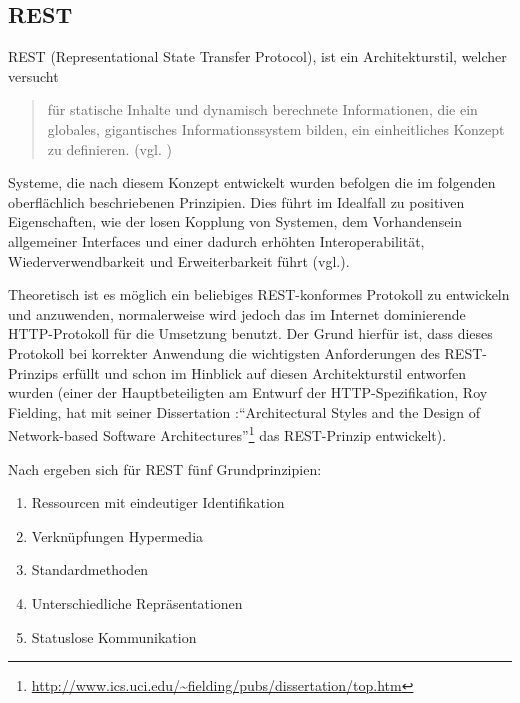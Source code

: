 \subsection{REST}\label{section:rest}
REST (Representational State Transfer Protocol), ist ein Architekturstil, welcher versucht 
\begin{quotation}
für statische Inhalte und dynamisch berechnete Informationen, die ein globales, gigantisches Informationssystem bilden, ein einheitliches Konzept zu definieren. (vgl. \cite{tilkovrestchapter2})
\end{quotation}
Systeme, die nach diesem Konzept entwickelt wurden befolgen die im folgenden oberflächlich beschriebenen Prinzipien. Dies führt im Idealfall zu positiven Eigenschaften, wie der losen Kopplung von Systemen, dem Vorhandensein allgemeiner Interfaces und einer dadurch erhöhten Interoperabilität, Wiederverwendbarkeit und Erweiterbarkeit führt (vgl.\cite{tilkovrestchapter2}).

Theoretisch ist es möglich ein beliebiges REST-konformes Protokoll zu entwickeln und anzuwenden, normalerweise wird jedoch das im Internet dominierende HTTP-Protokoll für die Umsetzung benutzt. Der Grund hierfür ist, dass dieses Protokoll bei korrekter Anwendung die wichtigsten Anforderungen des REST-Prinzips erfüllt und schon im Hinblick auf diesen Architekturstil entworfen wurden (einer der Hauptbeteiligten am Entwurf der HTTP-Spezifikation, Roy Fielding, hat mit seiner Dissertation :"`Architectural Styles and the Design of Network-based Software Architectures"'\footnote{\url{http://www.ics.uci.edu/~fielding/pubs/dissertation/top.htm}} das REST-Prinzip entwickelt). 

Nach \cite{tilkovrestchapter2} ergeben sich für REST fünf Grundprinzipien:
\begin{enumerate}
 \item\label{enumerate_rest_principles:1} Ressourcen mit eindeutiger Identifikation
 \item\label{enumerate_rest_principles:2} Verknüpfungen Hypermedia
 \item\label{enumerate_rest_principles:3} Standardmethoden
 \item\label{enumerate_rest_principles:4} Unterschiedliche Repräsentationen
 \item\label{enumerate_rest_principles:5} Statuslose Kommunikation
\end{enumerate}

